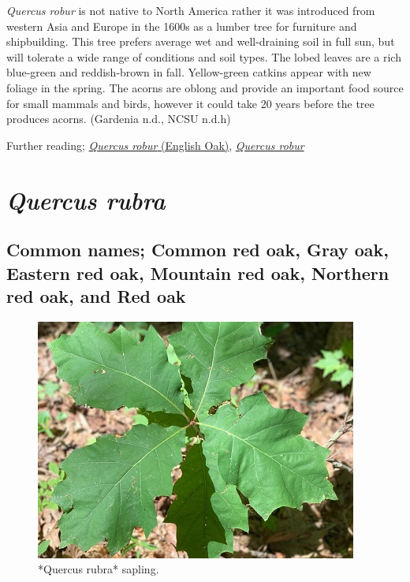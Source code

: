 \documentclass[
]{article}
\begin{document}
\emph{Quercus robur} is not native to North America rather it was introduced from western Asia and Europe in the 1600s as a lumber tree for furniture and shipbuilding. This tree prefers average wet and well-draining soil in full sun, but will tolerate a wide range of conditions and soil types. The lobed leaves are a rich blue-green and reddish-brown in fall. Yellow-green catkins appear with new foliage in the spring. The acorns are oblong and provide an important food source for small mammals and birds, however it could take 20 years before the tree produces acorns. (Gardenia n.d., NCSU n.d.h)

Further reading; \href{https://www.gardenia.net/plant/quercus-robur}{\emph{Quercus robur} (English Oak)}, \href{https://plants.ces.ncsu.edu/plants/quercus-robur/}{\emph{Quercus robur}}

\hypertarget{quercus-rubra}{%
\section{\texorpdfstring{\emph{Quercus rubra}}{Quercus rubra}}\label{quercus-rubra}}

\hypertarget{common-names-common-red-oak-gray-oak-eastern-red-oak-mountain-red-oak-northern-red-oak-and-red-oak}{%
\subsection{Common names; Common red oak, Gray oak, Eastern red oak, Mountain red oak, Northern red oak, and Red oak}\label{common-names-common-red-oak-gray-oak-eastern-red-oak-mountain-red-oak-northern-red-oak-and-red-oak}}

\begin{figure}

{\centering \includegraphics[width=0.5\linewidth]{redoak1} 

}

\caption{*Quercus rubra* sapling.}\label{fig:redoaks}
\end{figure}
\end{document}
